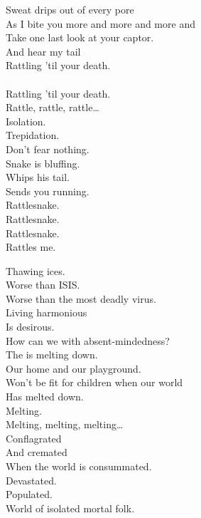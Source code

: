 Sweat drips out of every pore \\
As I bite you more and more and more and \\
Take one last look at your captor. \\
And hear my tail \\
Rattling 'til your death. \\ \\

Rattling 'til your death. \\

Rattle, rattle, rattle… \\

Isolation. \\
Trepidation. \\
Don't fear nothing. \\
Snake is bluffing. \\
Whips his tail. \\
Sends you running. \\

Rattlesnake. \\
Rattlesnake. \\
Rattlesnake. \\
Rattles me. \\





Thawing ices. \\
Worse than ISIS. \\
Worse than the most deadly virus. \\
Living harmonious \\
Is desirous. \\
How can we with absent-mindedness? \\

The  is melting down. \\
Our home and our playground. \\
Won't be fit for children when our world \\
Has melted down. \\

Melting. \\
Melting, melting, melting… \\

Conflagrated \\
And cremated \\
When the world is consummated. \\
Devastated. \\
Populated. \\
World of isolated mortal folk. \\

